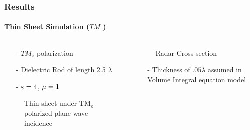 \documentclass[mathserif,18pt,xcolor=table]{beamer}
\begin{document}

\begin{frame}
\frametitle{Results}
\framesubtitle{Thin Sheet Simulation ($TM_z$)}
\begin{columns}[T] %
  \begin{column}{.5\textwidth}
    \begin{itemize}
      \item[-]{$TM_z$ polarization}
      \item[-]{Dielectric Rod of length 2.5 $\lambda$}
      \item[-]{$\varepsilon = 4$, $\mu = 1$}
    \end{itemize}
    \begin{figure}[h]
      \normalsize
      \centering
      
      \caption{Thin sheet under $\mathrm{TM_z}$ polarized plane wave incidence}
      \label{fig:tm_plate}
    \end{figure}
  \end{column}
  \begin{column}[T]{.5\textwidth}
    \begin{figure}
      \vspace*{-2cm}
      
      \caption{Radar Cross-section}
      \label{fig:TM_rcs}
    \end{figure}
    \begin{itemize}
      \item[-]{Thickness of $.05 \lambda$ assumed in Volume Integral equation model}
    \end{itemize}
    \end{column}%
  \end{columns}
\end{frame}
\end{document}
